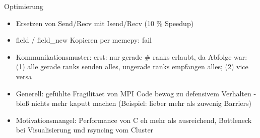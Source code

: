 \begin{frame}{Optimierung}
	\begin{itemize}
		\item Ersetzen von Send/Recv mit Isend/Recv (10 \% Speedup)
		\item field / field\_new Kopieren per memcpy: fail
    \item Kommunikationsmuster: erst: nur gerade \# ranks erlaubt, da Abfolge war: (1) alle gerade ranks senden alles, ungerade ranks empfangen alles; (2) vice versa
    \item Generell: gefühlte Fragilitaet von MPI Code bewog zu defensivem Verhalten - bloß nichts mehr kaputt machen (Beispiel: lieber mehr als zuwenig Barriers)
    \item Motivationsmangel: Performance von C eh mehr als ausreichend, Bottleneck bei
      Visualisierung und rsyncing vom Cluster
	\end{itemize}
\end{frame}
